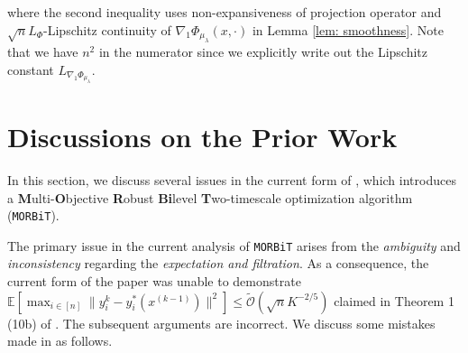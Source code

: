 \documentclass[10pt]{article}
\theoremstyle{remark}
\newcommand{\cO}{\mathcal{O}}
\newcommand{\cX}{\mathcal{X}}
\newcommand{\E}{\mathbb{E}}
\DeclareMathOperator{\proj}{\Pi}
\begin{document}
where the second inequality uses non-expansiveness of projection operator and $\sqrt{n}L_{\Phi}$-Lipschitz continuity of $\nabla_1\Phi_{\mu_{\lambda}}(x,\cdot)$ in Lemma \ref{lem: smoothness}. Note that we have $n^2$ in the numerator since we explicitly write out the Lipschitz constant $L_{\nabla_1\Phi_{\mu_{\lambda}}}$.

\section{Discussions on the Prior Work \cite{gu2022min}}\label{sec: app_discussion}
In this section, we discuss several issues in the current form of \cite{gu2022min}, which introduces a \textbf{M}ulti-\textbf{O}bjective \textbf{R}obust \textbf{Bi}level \textbf{T}wo-timescale optimization algorithm (\texttt{MORBiT}). 



The primary issue in the current analysis of \texttt{MORBiT} arises from the \textit{ambiguity} and \textit{inconsistency} regarding the \textit{expectation and filtration}. As a consequence, the current form of the paper was unable to demonstrate $\E[\max_{i\in [n]}\|y_i^{k} - y_i^*(x^{(k-1)})\|^2 ]\leq \tilde{\cO}(\sqrt{n}K^{-2/5})$ claimed in Theorem 1 (10b) of \cite{gu2022min}. The subsequent arguments are incorrect. We discuss some mistakes made in \cite{gu2022min} as follows.
\end{document}
